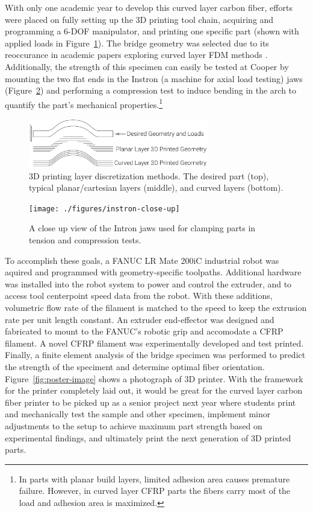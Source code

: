 With only one academic year to develop this curved layer carbon fiber, efforts were placed on fully setting up the 3D printing tool chain, acquiring and programming a 6-DOF manipulator, and printing one specific part (shown with applied loads in Figure~\ref{fig:intro-layers-geometry-loads}). The bridge geometry was selected due to its reoccurance in academic papers exploring curved layer FDM methods \cite{cute-curves}. Additionally, the strength of this specimen can easily be tested at Cooper by mounting the two flat ends in the Instron (a machine for axial load testing) jaws (Figure~\ref{fig:instron-close-up}) and performing a compression test to induce bending in the arch to quantify the part's mechanical properties.\footnote{In parts with planar build layers, limited adhesion area causes premature failure. However, in curved layer CFRP parts the fibers carry most of the load and adhesion area is maximized.}\\

\begin{figure}[h!]
\centering
\includegraphics[width=0.7\textwidth]{./figures/intro-layers-geometry-loads}
\caption{3D printing layer discretization methods. The desired part (top), typical planar/cartesian layers (middle), and curved layers (bottom).}
\label{fig:intro-layers-geometry-loads}
\end{figure}

\begin{figure}[h!]
\centering
\texttt{[image: ./figures/instron-close-up]}
\caption{A close up view of the Intron jaws used for clamping parts in tension and compression tests.}
\label{fig:instron-close-up}
\end{figure}

To accomplish these goals, a FANUC LR Mate 200iC industrial robot was aquired and programmed with geometry-specific toolpaths. Additional hardware was installed into the robot system to power and control the extruder, and to access tool centerpoint speed data from the robot. With these additions, volumetric flow rate of the filament is matched to the speed to keep the extrusion rate per unit length constant. An extruder end-effector was designed and fabricated to mount to the FANUC's robotic grip and accomodate a CFRP filament. A novel CFRP filament was experimentally developed and test printed. Finally, a finite element analysis of the bridge specimen was performed to predict the strength of the speciment and determine optimal fiber orientation. Figure~\ref{fig:poster-image} shows a photograph of 3D printer. With the framework for the printer completely laid out, it would be great for the curved layer carbon fiber printer to be picked up as a senior project next year where students print and mechanically test the sample and other specimen, implement minor adjustments to the setup to achieve maximum part strength based on experimental findings, and ultimately print the next generation of 3D printed parts.\\

